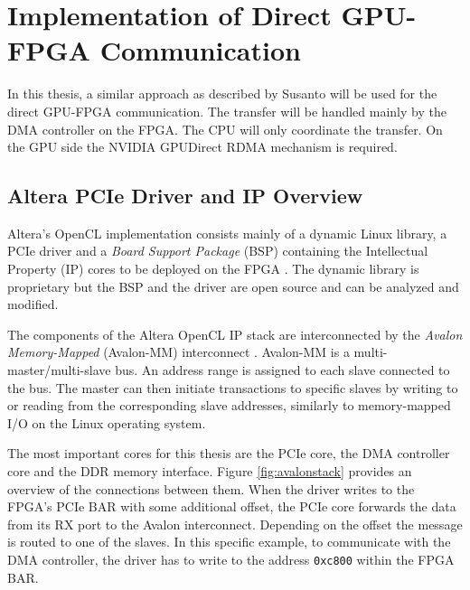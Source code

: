 \chapter{Implementation of Direct GPU-FPGA Communication}
\label{section:implementation}

In this thesis, a similar approach as described by Susanto \cite{susanto} will be used for the direct GPU-FPGA communication.
The transfer will be handled mainly by the DMA controller on the FPGA.
The CPU will only coordinate the transfer.
On the GPU side the NVIDIA GPUDirect RDMA mechanism is required.




\section{Altera PCIe Driver and IP Overview}




Altera's OpenCL implementation consists mainly of a dynamic Linux library, a PCIe driver and a \emph{Board Support Package} (BSP) containing the Intellectual Property (IP) cores to be deployed on the FPGA \cite{altera_driver}.
The dynamic library is proprietary but the BSP and the driver are open source and can be analyzed and modified.

The components of the Altera OpenCL IP stack are interconnected by the \emph{Avalon Memory-Mapped} (Avalon-MM) interconnect \cite{altera_driver, avalon}.
Avalon-MM is a multi-master/multi-slave bus.
An address range is assigned to each slave connected to the bus.
The master can then initiate transactions to specific slaves by writing to or reading from the corresponding slave addresses, similarly to memory-mapped I/O on the Linux operating system.

The most important cores for this thesis are the PCIe core, the DMA controller core and the DDR memory interface.
Figure \ref{fig:avalonstack} provides an overview of the connections between them.
When the driver writes to the FPGA's PCIe BAR with some additional offset, the PCIe core forwards the data from its RX port to the Avalon interconnect.
Depending on the offset the message is routed to one of the slaves.
In this specific example, to communicate with the DMA controller, the driver has to write to the address \texttt{0xc800} within the FPGA BAR.

